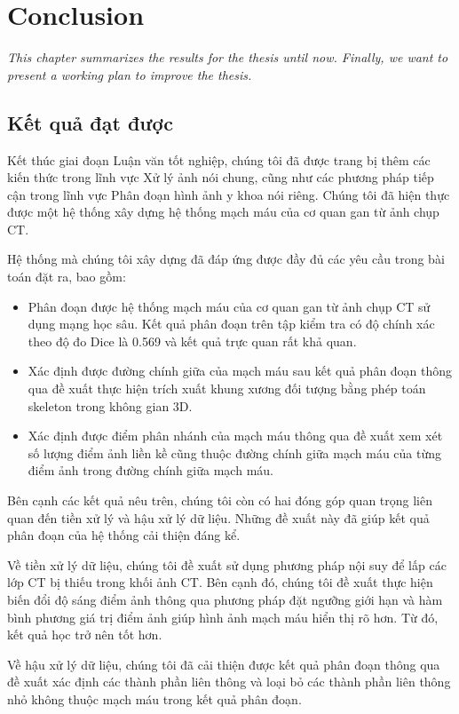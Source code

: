 \chapter{Conclusion}
\label{chap:conclusion}
	\textit{This chapter summarizes the results for the thesis until now. Finally, we want to present a working plan to improve the thesis.}
\minitoc

\section{Kết quả đạt được}
\label{sec:ket_qua_dat_duoc}
	Kết thúc giai đoạn Luận văn tốt nghiệp, chúng tôi đã được trang bị thêm các kiến thức trong lĩnh vực Xử lý ảnh nói chung, cũng như các phương pháp tiếp cận trong lĩnh vực Phân đoạn hình ảnh y khoa nói riêng. Chúng tôi đã hiện thực được một hệ thống xây dựng hệ thống mạch máu của cơ quan gan từ ảnh chụp CT.
	
	Hệ thống mà chúng tôi xây dựng đã đáp ứng được đầy đủ các yêu cầu trong bài toán đặt ra, bao gồm:
	\begin{itemize}
		\item Phân đoạn được hệ thống mạch máu của cơ quan gan từ ảnh chụp CT sử dụng mạng học sâu. Kết quả phân đoạn trên tập kiểm tra có độ chính xác theo độ đo Dice là 0.569 và kết quả trực quan rất khả quan.
		\item Xác định được đường chính giữa của mạch máu sau kết quả phân đoạn thông qua đề xuất thực hiện trích xuất khung xương đối tượng bằng phép toán skeleton trong không gian 3D.
		\item Xác định được điểm phân nhánh của mạch máu thông qua đề xuất xem xét số lượng điểm ảnh liền kề cũng thuộc đường chính giữa mạch máu của từng điểm ảnh trong đường chính giữa mạch máu.
	\end{itemize}
	
	 Bên cạnh các kết quả nêu trên, chúng tôi còn có hai đóng góp quan trọng liên quan đến tiền xử lý và hậu xử lý dữ liệu. Những đề xuất này đã giúp kết quả phân đoạn của hệ thống cải thiện đáng kể.
	 
	 Về tiền xử lý dữ liệu, chúng tôi đề xuất sử dụng phương pháp nội suy để lấp các lớp CT bị thiếu trong khối ảnh CT. Bên cạnh đó, chúng tôi đề xuất thực hiện biến đổi độ sáng điểm ảnh thông qua phương pháp đặt ngưỡng giới hạn và hàm bình phương giá trị điểm ảnh giúp hình ảnh mạch máu hiển thị rõ hơn. Từ đó, kết quả học trở nên tốt hơn.
	 
	 Về hậu xử lý dữ liệu, chúng tôi đã cải thiện được kết quả phân đoạn thông qua đề xuất xác định các thành phần liên thông và loại bỏ các thành phần liên thông nhỏ không thuộc mạch máu trong kết quả phân đoạn.
	 
